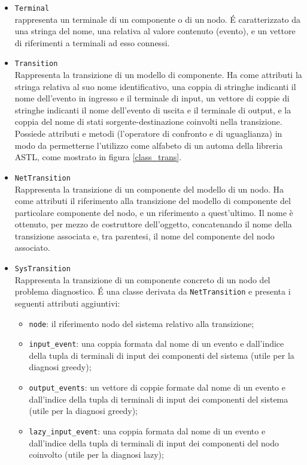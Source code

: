 \begin{itemize}
\item \verb|Terminal|\\
rappresenta un terminale di un componente o di un nodo. \'E caratterizzato da una stringa del nome, una relativa al valore contenuto (evento), e un vettore di riferimenti a terminali ad esso connessi.
\item \verb|Transition|\\ 
Rappresenta la transizione di un modello di componente. Ha come attributi la stringa relativa al suo nome identificativo, una coppia di stringhe indicanti il nome dell'evento in ingresso e il terminale di input, un vettore di coppie di stringhe indicanti il nome dell'evento di uscita e il terminale di output, e la coppia del nome di stati sorgente-destinazione coinvolti nella transizione. 
Possiede attributi e metodi (l'operatore di confronto e di uguaglianza) in modo da permetterne l'utilizzo come alfabeto di un automa della libreria ASTL, come mostrato in figura \ref{class_trans}.
\item \verb|NetTransition|\\
Rappresenta la transizione di un componente del modello di un nodo. Ha come attributi il riferimento alla transizione del modello di componente del particolare componente del nodo, e un riferimento a quest'ultimo. Il nome è ottenuto, per mezzo de costruttore dell'oggetto, concatenando il nome della transizione associata e, tra parentesi, il nome del componente del nodo associato.
\item \verb|SysTransition|\\
Rappresenta la transizione di un componente concreto di un nodo del problema diagnostico. \'E una classe derivata da \verb|NetTransition| e presenta i seguenti attributi aggiuntivi:
\begin{itemize}
\item \verb|node|: il riferimento nodo del sistema relativo alla transizione;
\item \verb|input_event|: una coppia formata dal nome di un evento e dall'indice della tupla di terminali di input dei componenti del sistema (utile per la diagnosi greedy);
\item \verb|output_events|: un vettore di coppie formate dal nome di un evento e dall'indice della tupla di terminali di input dei componenti del sistema (utile per la diagnosi greedy);
\item \verb|lazy_input_event|: una coppia formata dal nome di un evento e dall'indice della tupla di terminali di input dei componenti del nodo coinvolto (utile per la diagnosi lazy);

\end{itemize}
\end{itemize}
